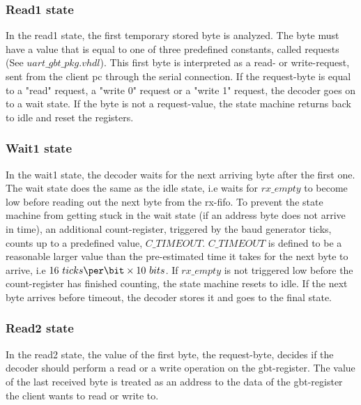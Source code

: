 \documentclass[main.tex]{subfiles}
\begin{document}
\subsubsection{Read1 state}
 In the read1 state, the first temporary stored byte is analyzed. The byte must have a value that is equal to one of three predefined constants, called requests (See $uart\_gbt\_pkg.vhdl$). This first byte is interpreted as a read- or write-request, sent from the client \acrshort{pc} through the serial connection. If the request-byte is equal to a "read" request, a "write 0" request or a "write 1" request, the decoder goes on to a wait state. If the byte is not a request-value, the state machine returns back to idle and reset the registers.

\subsubsection{Wait1 state}
  In the wait1 state, the decoder waits for the next arriving byte after the first one. The wait state does the same as the idle state, i.e waits for $rx\_empty$ to become low before reading out the next byte from the rx-fifo. To prevent the state machine from getting stuck in the wait state (if an address byte does not arrive in time), an additional count-register, triggered by the baud generator ticks, counts up to a predefined value, $C\_TIMEOUT$. $C\_TIMEOUT$ is defined to be a reasonable larger value than the pre-estimated time it takes for the next byte to arrive, i.e $16 ~ticks\per\bit \times 10 ~bits$. If $rx\_empty$ is not triggered low before the count-register has finished counting, the state machine resets to idle. If the next byte arrives before timeout, the decoder stores it and goes to the final state.

\subsubsection{Read2 state}
  In the read2 state, the value of the first byte, the request-byte, decides if the decoder should perform a read or a write operation on the gbt-register. The value of the last received byte is treated as an address to the data of the gbt-register the client wants to read or write to.  

  
\end{document}
